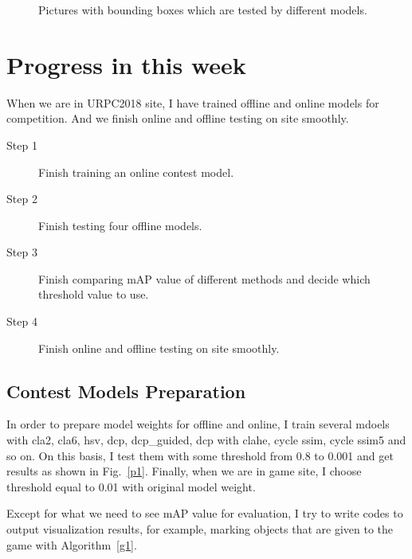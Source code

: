 \documentclass[a4paper]{article}
\begin{document}
\begin{figure}
{		}
		\caption{Pictures with bounding boxes which are tested by different models.} 
		\label{p3} %
	\end{figure}
	
	\section{Progress in this week}
	
	When we are in URPC2018 site, I have trained offline and online models for competition. And we finish online and offline testing on site smoothly.
	\begin{description}
		\item[Step 1] Finish training an online contest model.
		\item[Step 2] Finish testing four offline models.
		\item[Step 3] Finish comparing mAP value of different methods and decide which threshold value to use.
		\item[Step 4] Finish online and offline testing on site smoothly.\label{t2}
	\end{description}
	
	\subsection{Contest Models Preparation}
	
	In order to prepare model weights for offline and online, I train several mdoels with cla2, cla6, hsv, dcp, dcp\_guided, dcp with clahe, cycle ssim, cycle ssim5 and so on. On this basis, I test them with some threshold from 0.8 to 0.001 and get results as shown in Fig.~\ref{p1}. Finally, when we are in game site, I choose threshold equal to 0.01 with original model weight.
	
	Except for what we need to see mAP value for evaluation, I try to write codes to output visualization results, for example, marking objects that are given to the game with Algorithm~\ref{g1}.
	
\end{document}
